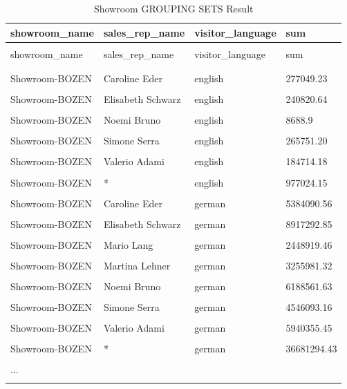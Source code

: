 \documentclass[letterpaper,12pt]{article}
\begin{document}
\begingroup
\renewcommand\arraystretch{0.5}
\begin{longtable}{p{4cm}p{4cm}p{4cm}p{4cm}}
        \caption{Showroom GROUPING SETS Result} \\
				showroom\_name & sales\_rep\_name & visitor\_language & sum \\
        \endfirsthead \\
        showroom\_name & sales\_rep\_name & visitor\_language & sum \\
        \endhead \\
				\hline \\
Showroom-BOZEN & Caroline Eder & english & 277049.23 \\
\hline \\
Showroom-BOZEN & Elisabeth Schwarz & english & 240820.64 \\
\hline \\
Showroom-BOZEN & Noemi Bruno & english & 8688.9 \\
\hline \\
Showroom-BOZEN & Simone Serra & english & 265751.20 \\
\hline \\
Showroom-BOZEN & Valerio Adami & english & 184714.18 \\
\hline \\
Showroom-BOZEN & * & english & 977024.15 \\
\hline \\
Showroom-BOZEN & Caroline Eder & german & 5384090.56 \\
\hline \\
Showroom-BOZEN & Elisabeth Schwarz & german & 8917292.85 \\
\hline \\
Showroom-BOZEN & Mario Lang & german & 2448919.46 \\
\hline \\
Showroom-BOZEN & Martina Lehner & german & 3255981.32 \\
\hline \\
Showroom-BOZEN & Noemi Bruno & german & 6188561.63 \\
\hline \\
Showroom-BOZEN & Simone Serra & german & 4546093.16 \\
\hline \\
Showroom-BOZEN & Valerio Adami & german & 5940355.45 \\
\hline \\
Showroom-BOZEN & * & german & 36681294.43 \\
\hline \\

... & & & \\
\hline \\
\end{longtable} 
\endgroup           
\end{document}
